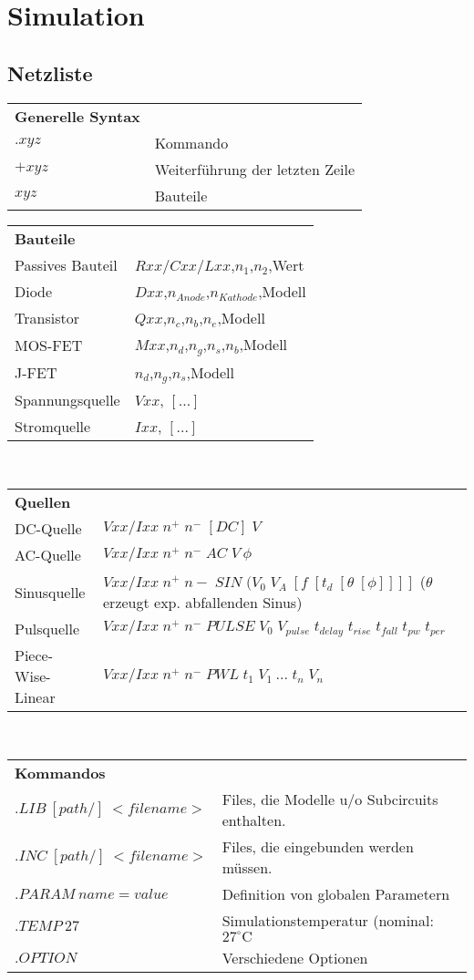 \section{Simulation}
	\subsection{Netzliste}
			\begin{tabular}{l l}
				{\bf Generelle Syntax}\\
				$.xyz$ & Kommando \\
				$+xyz$ & Weiterführung der letzten Zeile \\
				$xyz$ & Bauteile\\
			\end{tabular}
			\begin{tabular}{l l}
				{\bf Bauteile}\\
				Passives Bauteil & $Rxx/Cxx/Lxx$,$n_1$,$n_2$,Wert \\
				Diode & $Dxx$,$n_{Anode}$,$n_{Kathode}$,Modell \\
				Transistor & $Qxx$,$n_{c}$,$n_{b}$,$n_{e}$,Modell \\
				MOS-FET & $Mxx$,$n_{d}$,$n_{g}$,$n_{s}$,$n_{b}$,Modell \\
				J-FET & $n_{d}$,$n_{g}$,$n_{s}$,Modell\\
				Spannungsquelle & $Vxx$, $[...]$\\
				Stromquelle & $Ixx$, $[...]$\\
			\end{tabular} \\
			\begin{tabular}{l l }
				{\bf Quellen}\\
				DC-Quelle & $Vxx/Ixx \; n^+ \; n^- \; [DC] \; V$ \\
				AC-Quelle & $Vxx/Ixx \; n^+ \; n^- \; AC \; V \: \phi$ \\
				Sinusquelle & $Vxx/Ixx \; n^+ \; n- \; SIN \; (V_0 \; V_A \; [f \; [t_d \; [\theta \; [\phi]]]]$ ($\theta$ erzeugt exp. abfallenden Sinus) \\
				Pulsquelle	& $Vxx/Ixx \; n^+ \; n^- \;  PULSE \; V_0 \; V_{pulse} \; t_{delay} \; t_{rise} \; t_{fall} \; t_{pw} \; t_{per}$\\
				Piece-Wise-Linear & $Vxx/Ixx \; n^+ \; n^- \; PWL \; t_1 \; V_1 \: ... \; t_n \; V_n$\\
			\end{tabular}\\
			\begin{tabular}{l l}
			{\bf Kommandos}\\
				$.LIB \: [path/] \: <filename>$ & Files, die Modelle u/o Subcircuits enthalten. \\
				$.INC \: [path/] \: <filename>$ & Files, die eingebunden werden müssen. \\ 
				$.PARAM \: name=value$ & Definition von globalen Parametern \\
				$.TEMP \: 27$ & Simulationstemperatur (nominal: $27 ^{\circ}\mathrm{C}$ \\
				$.OPTION$ & Verschiedene Optionen\\
			\end{tabular}
